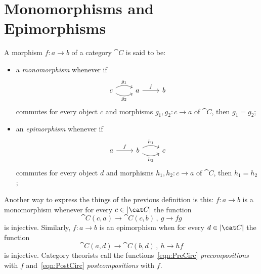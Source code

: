 
\section{Monomorphisms and Epimorphisms}


\begin{definition}
A morphism \(f : a \to b\) of a category \(\cat C\) is said to be:
\begin{itemize}
\item a {\em monomorphism} whenever if
\[\begin{tikzcd}
c \ar["{g_1}", r, bend left] \ar["{g_2}", r, bend right, swap] & a \ar["f", r] & b
\end{tikzcd}\]
commutes for every object \(c\) and morphisms \(g_1, g_2 : c \to a\) of \(\cat C\), then \(g_1 = g_2\);
\item an {\em epimorphism} whenever if
\[\begin{tikzcd}
a \ar["f", r] & b \ar["{h_1}", r, bend left] \ar["{h_2}", r, bend right, swap] & c
\end{tikzcd}\]
commutes for every object \(d\) and morphisms \(h_1, h_2 : c \to a\) of \(\cat C\), then \(h_1 = h_2\);
\end{itemize}
\end{definition}

\NotaInterna{\dots{}}

Another way to express the things of the previous definition is this:
\(f : a \to b\) is a monomorphism whenever for every \(c \in \obj{\cat C}\) the function
\begin{equation}\cat C (c, a) \to \cat C (c, b)\,, \ g \to fg \label{eqn:PreCirc}\end{equation}
is injective. Similarly, \(f : a \to b\) is an epimorphism when for every \(d \in \obj{\cat C}\) the function
\begin{equation}\cat C (a, d) \to \cat C (b, d)\,, \ h \to hf \label{eqn:PostCirc}\end{equation}
is injective. Category theorists call the functions~\eqref{eqn:PreCirc} {\em precompositions} with \(f\) and~\eqref{eqn:PostCirc} {\em postcompositions} with \(f\).
